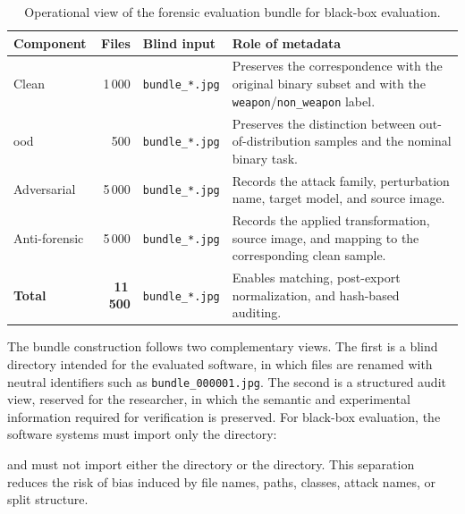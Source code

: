 \begin{table}[H]
\centering
\scriptsize
\renewcommand{\arraystretch}{1.15}
\setlength{\tabcolsep}{4pt}
\caption{Operational view of the forensic evaluation bundle for black-box evaluation.}
\label{tab:results-bundle-operational-layout}
\begin{tabularx}{\textwidth}{@{}l r l X@{}}
\toprule
\textbf{Component} &
\textbf{Files} &
\textbf{Blind input} &
\textbf{Role of metadata} \\
\midrule

Clean &
1\,000 &
\texttt{bundle\_*.jpg} &
Preserves the correspondence with the original binary subset and with the
\texttt{weapon}/\texttt{non\_weapon} label. \\

\gls{ood} &
500 &
\texttt{bundle\_*.jpg} &
Preserves the distinction between out-of-distribution samples and the nominal
binary task. \\

Adversarial &
5\,000 &
\texttt{bundle\_*.jpg} &
Records the attack family, perturbation name, target model, and source image. \\

Anti-forensic &
5\,000 &
\texttt{bundle\_*.jpg} &
Records the applied transformation, source image, and mapping to the
corresponding clean sample. \\

\midrule
\textbf{Total} &
\textbf{11\,500} &
\texttt{bundle\_*.jpg} &
Enables matching, post-export normalization, and hash-based auditing. \\
\bottomrule
\end{tabularx}
\end{table}

The bundle construction follows two complementary views. The first is a blind
directory intended for the evaluated software, in which files are renamed with
neutral identifiers such as \texttt{bundle\_000001.jpg}. The second is a
structured audit view, reserved for the researcher, in which the semantic and
experimental information required for verification is preserved. For black-box
evaluation, the software systems must import only the directory:

\begin{center}
\end{center}

and must not import either the  directory or the
 directory. This separation reduces the risk
of bias induced by file names, paths, classes, attack names, or split
structure.

